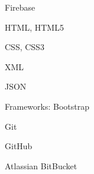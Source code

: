 \documentclass[]{deedy-resume-openfont}
\begin{document}
\begin{tightemize}
\item Firebase
\end{tightemize}
\sectionsep

\begin{tightemize}
\item HTML, HTML5
\item CSS, CSS3
\item XML
\item JSON
\item Frameworks: Bootstrap
\end{tightemize}
\sectionsep

\begin{tightemize}
\item Git
\item GitHub
\item Atlassian BitBucket
\end{tightemize}
\sectionsep




\end{document}
